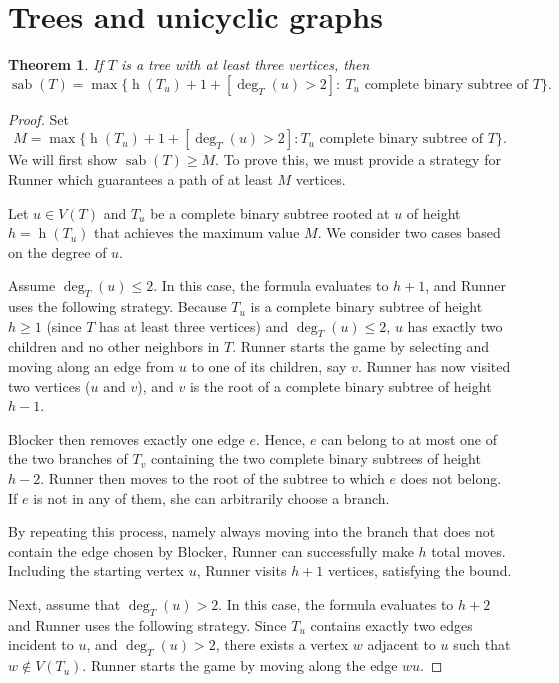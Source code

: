 \documentclass[10pt,a4paper]{amsart}
\newtheorem{theorem}{Theorem}[section]
\DeclareMathOperator{\sab}{\mathrm{sab}}
\DeclareMathOperator{\height}{\mathrm{h}}
\begin{document}
\section{Trees and unicyclic graphs}
\label{sec:trees}

\begin{theorem}
\label{thm:trees}
If $T$ is a tree with at least three vertices, then 
\[
\sab(T)=\max\{\height(T_u) + 1 + [\deg_{T}(u)>2] : \ T_u \text{ complete binary subtree of } T\}.
\]
\end{theorem}

\begin{proof}
Set 
\[
M = \max\{ \height(T_u) + 1 + [\deg_T(u) > 2] : T_u \text{ complete binary subtree of } T \}.
\]
We will first show $\sab(T) \ge M$. To prove this, we must provide a strategy for Runner which guarantees a path of at least $M$ vertices. 

Let $u \in V(T)$ and $T_u$ be a complete binary subtree rooted at $u$ of height $h = \height(T_u)$ that achieves the maximum value $M$. We consider two cases based on the degree of $u$.

Assume $\deg_T(u) \le 2$. In this case, the formula evaluates to $h + 1$, and Runner uses the following strategy. Because $T_u$ is a complete binary subtree of height $h \ge 1$ (since $T$ has at least three vertices) and $\deg_T(u) \le 2$, $u$ has exactly two children and no other neighbors in $T$. Runner starts the game by selecting and moving along an edge from $u$ to one of its children, say $v$. Runner has now visited two vertices ($u$ and $v$), and $v$ is the root of a complete binary subtree of height $h-1$. 

Blocker then removes exactly one edge $e$. Hence, $e$ can belong to at most one of the two branches of $T_v$ containing the two complete binary subtrees of height $h-2$. Runner then moves to the root of the subtree to which $e$ does not belong. If $e$ is not in any of them, she can arbitrarily choose a branch. 

By repeating this process, namely always moving into the branch that does not contain the edge chosen by Blocker, Runner can successfully make $h$ total moves. Including the starting vertex $u$, Runner visits $h + 1$ vertices, satisfying the bound.

Next, assume that $\deg_T(u) > 2$. In this case, the formula evaluates to $h + 2$ and Runner uses the following strategy. Since $T_u$ contains exactly two edges incident to $u$, and $\deg_T(u) > 2$, there exists a vertex $w$ adjacent to $u$ such that $w\not\in V(T_u)$. Runner starts the game by moving along the edge $wu$. 


\end{proof}
\end{document}
